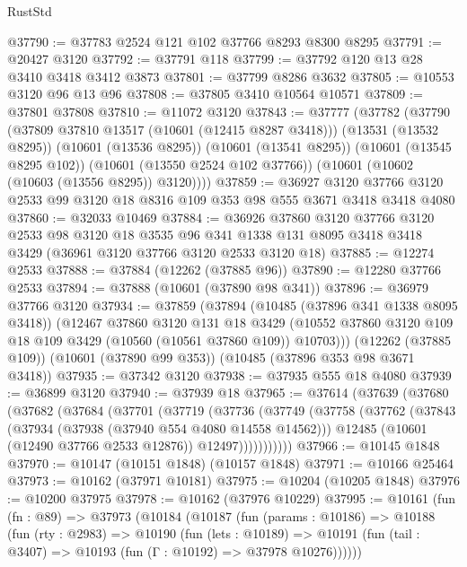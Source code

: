 \begin{lexlean}{RustStd}
\begin{coremodule}
@37790 := @37783 @2524 @121 @102 @37766 @8293 @8300 @8295
@37791 := @20427 @3120
@37792 := @37791 @118
@37799 := @37792 @120 @13 @28 @3410 @3418 @3412 @3873
@37801 := @37799 @8286 @3632
@37805 := @10553 @3120 @96 @13 @96
@37808 := @37805 @3410 @10564 @10571
@37809 := @37801 @37808
@37810 := @11072 @3120
@37843 := @37777
    (@37782
      (@37790
        (@37809 @37810 @13517 (@10601 (@12415 @8287 @3418)))
        (@13531 (@13532 @8295))
        (@10601 (@13536 @8295))
        (@10601 (@13541 @8295))
        (@10601 (@13545 @8295 @102))
        (@10601 (@13550 @2524 @102 @37766))
        (@10601 (@10602 (@10603 (@13556 @8295)) @3120))))
@37859 := @36927
    @3120
    @37766
    @3120
    @2533
    @99
    @3120
    @18
    @8316
    @109
    @353
    @98
    @555
    @3671
    @3418
    @3418
    @4080
@37860 := @32033 @10469
@37884 := @36926
    @37860
    @3120
    @37766
    @3120
    @2533
    @98
    @3120
    @18
    @3535
    @96
    @341
    @1338
    @131
    @8095
    @3418
    @3418
    @3429
    (@36961 @3120 @37766 @3120 @2533 @3120 @18)
@37885 := @12274 @2533
@37888 := @37884 (@12262 (@37885 @96))
@37890 := @12280 @37766 @2533
@37894 := @37888 (@10601 (@37890 @98 @341))
@37896 := @36979 @37766 @3120
@37934 := @37859
    (@37894
      (@10485 (@37896 @341 @1338 @8095 @3418))
      (@12467
        @37860
        @3120
        @131
        @18
        @3429
        (@10552 @37860 @3120 @109 @18 @109 @3429 (@10560 (@10561 @37860 @109)) @10703)))
    (@12262 (@37885 @109))
    (@10601 (@37890 @99 @353))
    (@10485 (@37896 @353 @98 @3671 @3418))
@37935 := @37342 @3120
@37938 := @37935 @555 @18 @4080
@37939 := @36899 @3120
@37940 := @37939 @18
@37965 := @37614
    (@37639
      (@37680
        (@37682
          (@37684
            (@37701
              (@37719
                (@37736
                  (@37749
                    (@37758
                      (@37762
                        (@37843
                          (@37934 (@37938 (@37940 @554 @4080 @14558 @14562)))
                          @12485
                          (@10601 (@12490 @37766 @2533 @12876))
                          @12497)))))))))))
@37966 := @10145 @1848
@37970 := @10147 (@10151 @1848) (@10157 @1848)
@37971 := @10166 @25464
@37973 := @10162 (@37971 @10181)
@37975 := @10204 (@10205 @1848)
@37976 := @10200 @37975
@37978 := @10162 (@37976 @10229)
@37995 := @10161
    (fun (fn : @89) =>
    @37973
      (@10184
        (@10187
          (fun (params : @10186) =>
          @10188
            (fun (rty : @2983) =>
            @10190
              (fun (lets : @10189) =>
              @10191 (fun (tail : @3407) => @10193 (fun (Γ : @10192) => @37978 @10276))))))

\end{coremodule}
\end{lexlean}
